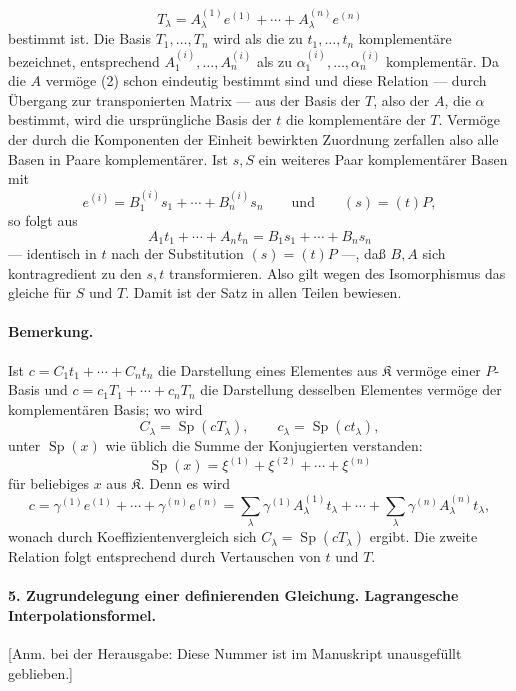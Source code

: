 \[
T_\lambda=A_\lambda^{(1)}e^{(1)}+\cdots+A_\lambda^{(n)}e^{(n)}
\]
bestimmt ist. Die Basis $T_1,\ldots,T_n$ wird als die zu $t_1,\ldots,t_n$ komplementäre bezeichnet, entsprechend $A_1^{(i)},\ldots,A_n^{(i)}$ als zu $\alpha_1^{(i)},\ldots,\alpha_n^{(i)}$ komplementär. Da die $A$ vermöge (2) schon eindeutig bestimmt sind und diese Relation --- durch Übergang zur transponierten Matrix --- aus der Basis der $T$, also der $A$, die $\alpha$ bestimmt, wird die ursprüngliche Basis der $t$ die komplementäre der $T$. Vermöge der durch die Komponenten der Einheit bewirkten Zuordnung zerfallen also alle Basen in Paare komplementärer. Ist $s,S$ ein weiteres Paar komplementärer Basen mit
\[
e^{(i)}=B_1^{(i)}s_1+\cdots+B_n^{(i)}s_n
\qquad\text{und}\qquad (s)=(t)P,
\]
so folgt aus
\[
A_1t_1+\cdots+A_nt_n=B_1s_1+\cdots+B_ns_n
\]
--- identisch in $t$ nach der Substitution $(s)=(t)P$ ---, daß $B,A$ sich kontragredient zu den $s,t$ transformieren. Also gilt wegen des Isomorphismus das gleiche für $S$ und $T$. Damit ist der Satz in allen Teilen bewiesen.

\paragraph{Bemerkung.}
Ist $c=C_1t_1+\cdots+C_nt_n$ die Darstellung eines Elementes aus $\mathfrak K$ vermöge einer $P$-Basis und $c=c_1T_1+\cdots+c_nT_n$ die Darstellung desselben Elementes vermöge der komplementären Basis; wo wird
\[
C_\lambda=\operatorname{Sp}(cT_\lambda),
\qquad c_\lambda=\operatorname{Sp}(ct_\lambda),
\]
unter $\operatorname{Sp}(x)$ wie üblich die Summe der Konjugierten verstanden:
\[
\operatorname{Sp}(x)=\xi^{(1)}+\xi^{(2)}+\cdots+\xi^{(n)}
\]
für beliebiges $x$ aus $\mathfrak K$. Denn es wird
\[
c=\gamma^{(1)}e^{(1)}+\cdots+\gamma^{(n)}e^{(n)}
=\sum_\lambda\gamma^{(1)}A_\lambda^{(1)}t_\lambda+
\cdots+\sum_\lambda\gamma^{(n)}A_\lambda^{(n)}t_\lambda,
\]
wonach durch Koeffizientenvergleich sich $C_\lambda=\operatorname{Sp}(cT_\lambda)$ ergibt. Die zweite Relation folgt entsprechend durch Vertauschen von $t$ und $T$.

\paragraph{5. Zugrundelegung einer definierenden Gleichung. Lagrangesche Interpolationsformel.}
[Anm. bei der Herausgabe: Diese Nummer ist im Manuskript unausgefüllt geblieben.]
